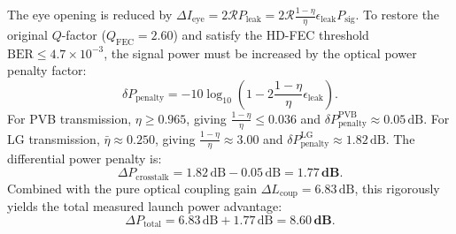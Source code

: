 \documentclass[11pt,a4paper]{article}
\begin{document}
The eye opening is reduced by $\Delta I_{\text{eye}} = 2 \mathcal{R} P_{\text{leak}} = 2 \mathcal{R} \frac{1 - \eta}{\eta} \epsilon_{\text{leak}} P_{\text{sig}}$. To restore the original $Q$-factor ($Q_{\text{FEC}} = 2.60$) and satisfy the HD-FEC threshold $\text{BER} \le 4.7 \times 10^{-3}$, the signal power must be increased by the optical power penalty factor:
\begin{equation}
\delta P_{\text{penalty}} = -10 \log_{10}\left( 1 - 2 \frac{1 - \eta}{\eta} \epsilon_{\text{leak}} \right).
\label{eq:app_eye_penalty}
\end{equation}
For PVB transmission, $\eta \ge 0.965$, giving $\frac{1 - \eta}{\eta} \le 0.036$ and $\delta P_{\text{penalty}}^{\text{PVB}} \approx 0.05\,\text{dB}$.
For LG transmission, $\bar{\eta} \approx 0.250$, giving $\frac{1 - \eta}{\eta} \approx 3.00$ and $\delta P_{\text{penalty}}^{\text{LG}} \approx 1.82\,\text{dB}$.
The differential power penalty is:
\begin{equation}
\Delta P_{\text{crosstalk}} = 1.82\,\text{dB} - 0.05\,\text{dB} = \mathbf{1.77\,\text{dB}}.
\label{eq:app_crosstalk_final}
\end{equation}
Combined with the pure optical coupling gain $\Delta L_{\text{coup}} = 6.83\,\text{dB}$, this rigorously yields the total measured launch power advantage:
\begin{equation}
\boxed{\Delta P_{\text{total}} = 6.83\,\text{dB} + 1.77\,\text{dB} = \mathbf{8.60\,\text{dB}}.}
\label{eq:app_total_860db}
\end{equation}



\end{document}
